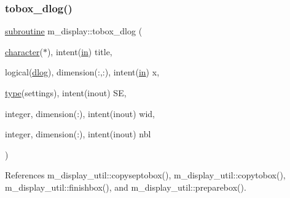 \subsubsection{\texorpdfstring{tobox\+\_\+dlog()}{tobox\_dlog()}}
{\footnotesize\ttfamily \hyperlink{M__stopwatch_83_8txt_acfbcff50169d691ff02d4a123ed70482}{subroutine} m\+\_\+display\+::tobox\+\_\+dlog (\begin{DoxyParamCaption}\item[{\hyperlink{option__stopwatch_83_8txt_abd4b21fbbd175834027b5224bfe97e66}{character}($\ast$), intent(\hyperlink{M__journal_83_8txt_afce72651d1eed785a2132bee863b2f38}{in})}]{title,  }\item[{logical(\hyperlink{namespacem__display_a8c6a3df510feabf6bc84dd0a8789f98c}{dlog}), dimension(\+:,\+:), intent(\hyperlink{M__journal_83_8txt_afce72651d1eed785a2132bee863b2f38}{in})}]{x,  }\item[{\hyperlink{stop__watch_83_8txt_a70f0ead91c32e25323c03265aa302c1c}{type}(settings), intent(inout)}]{SE,  }\item[{integer, dimension(\+:), intent(inout)}]{wid,  }\item[{integer, dimension(\+:), intent(inout)}]{nbl }\end{DoxyParamCaption})\hspace{0.3cm}{\ttfamily [private]}}



References m\+\_\+display\+\_\+util\+::copyseptobox(), m\+\_\+display\+\_\+util\+::copytobox(), m\+\_\+display\+\_\+util\+::finishbox(), and m\+\_\+display\+\_\+util\+::preparebox().

